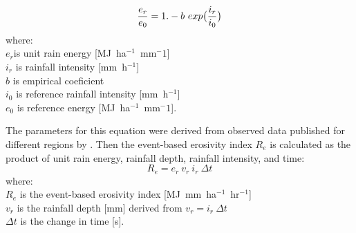 \documentclass[gmd, manuscript]{copernicus}
\begin{document}
\begin{equation}
\label{eq:rain_energy}
{e_r \over e_0} = 1.- b ~ exp\bigl({i_r \over i_0} \bigr)
\end{equation}
%
{\small
\noindent
where: \\
\noindent
\hspace*{0.5em} $e_r$is unit rain energy [\unit{MJ~ha}$^{-1}$~\unit{mm}${^-1}$]\\
\hspace*{0.5em} $i_r$ is rainfall intensity [\unit{mm~h}$^{-1}$]\\
\hspace*{0.5em} $b$ is empirical coeficient\\
\hspace*{0.5em} $i_0$ is reference rainfall intensity [\unit{mm~h}$^{-1}$]\\
\hspace*{0.5em} $e_0$ is reference energy [\unit{MJ~ha}$^{-1}$~\unit{mm}${^-1}$]. 
}

\noindent
The parameters for this equation were derived from observed data
published for different regions by \citet{Panagos2017}.
\noindent
Then the event-based erosivity index $R_e$ 
is calculated as the product of 
unit rain energy, rainfall depth, rainfall intensity, and time: 
\begin{equation}
\label{eq:erosivity_index}
{R_e = e_r ~ v_r ~ i_r ~ \Delta t}
\end{equation}
%
{\small
\noindent
where: \\
\hspace*{0.5em} $R_e$ is the event-based erosivity index [\unit{MJ~mm~ha}$^{-1}$~\unit{hr}$^{-1}$]\\
\hspace*{0.5em} $v_r$ is the rainfall depth [\unit{mm}] derived from ${v_r = i_r~\Delta t}$\\
\hspace*{0.5em} $\Delta t$ is the change in time [\unit{s}].
}


\end{document}

